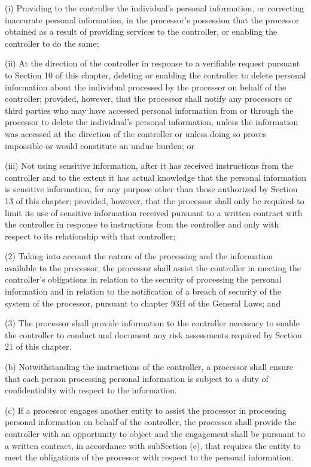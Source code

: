 (i) Providing to the controller the individual’s personal information, or correcting inaccurate personal information, in the processor’s possession that the processor obtained as a result of providing services to the controller, or enabling the controller to do the same;

(ii) At the direction of the controller in response to a verifiable request pursuant to Section 10 of this chapter, deleting or enabling the controller to delete personal information about the individual processed by the processor on behalf of the controller; provided, however, that the processor shall notify any processors or third parties who may have accessed personal information from or through the processor to delete the individual’s personal information, unless the information was accessed at the direction of the controller or unless doing so proves impossible or would constitute an undue burden; or

(iii) Not using sensitive information, after it has received instructions from the controller and to the extent it has actual knowledge that the personal information is sensitive information, for any purpose other than those authorized by Section 13 of this chapter; provided, however, that the processor shall only be required to limit its use of sensitive information received pursuant to a written contract with the controller in response to instructions from the controller and only with respect to its relationship with that controller;

(2) Taking into account the nature of the processing and the information available to the processor, the processor shall assist the controller in meeting the controller’s obligations in relation to the security of processing the personal information and in relation to the notification of a breach of security of the system of the processor, pursuant to chapter 93H of the General Laws; and

(3) The processor shall provide information to the controller necessary to enable the controller to conduct and document any risk assessments required by Section 21 of this chapter.

(b) Notwithstanding the instructions of the controller, a processor shall ensure that each person processing personal information is subject to a duty of confidentiality with respect to the information.

(c) If a processor engages another entity to assist the processor in processing personal information on behalf of the controller, the processor shall provide the controller with an opportunity to object and the engagement shall be pursuant to a written contract, in accordance with subSection (e), that requires the entity to meet the obligations of the processor with respect to the personal information.

